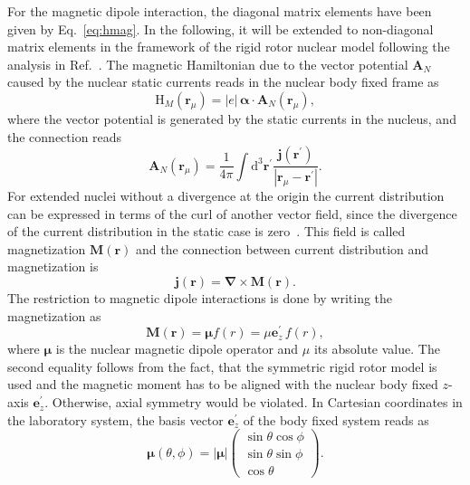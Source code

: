 For the magnetic dipole interaction, the diagonal matrix elements have been given by Eq.~\eqref{eq:hmag}. In the following, it will be extended to non-diagonal matrix elements in the framework of the rigid rotor nuclear model following the analysis in Ref.~\cite{Steffen1985}. The magnetic Hamiltonian due to the vector potential $\mathbf{A}_N$ caused by the nuclear static currents reads in the nuclear body fixed frame as
\begin{equation}
\label{eq:Hmag_rot}
\text{H}_{M}(\mathbf{r}_\mu) = |e|\,\boldsymbol{\alpha}\cdot \mathbf{A}_N(\mathbf{r}_\mu),
\end{equation}
where the vector potential is generated by the static currents in the nucleus, and the connection reads~\cite{jackson1999}
\begin{equation}
\mathbf{A}_N(\mathbf{r}_\mu) = \frac{1}{4\pi}\int\text{d}^3\mathbf{r}^\prime \frac{\mathbf{j}(\mathbf{r}^\prime)}{|\mathbf{r}_\mu-\mathbf{r}^\prime|}.
\end{equation}
For extended nuclei without a divergence at the origin the current distribution can be expressed in terms of the curl of another vector field, since the divergence of the current distribution in the static case is zero~\cite{jackson1999}. This field is called magnetization $\mathbf{M}(\mathbf{r})$ and the connection between current distribution and magnetization is
\begin{equation}
\mathbf{j}(\mathbf{r}) = \boldsymbol{\nabla} \times  \mathbf{M}(\mathbf{r}).
\end{equation}
The restriction to magnetic dipole interactions is done by writing the magnetization as
\begin{equation}
\mathbf{M}(\mathbf{r})=\boldsymbol{\mu}f(r)=\mu\mathbf{e}_z^\prime\,f(r),
\end{equation}
where $\boldsymbol{\mu}$ is the nuclear magnetic dipole operator and $\mu$ its absolute value. The second equality follows from the fact, that the symmetric rigid rotor model is used and the magnetic moment has to be aligned with the nuclear body fixed $z$-axis $\mathbf{e}_z^\prime$. Otherwise, axial symmetry would be violated.
In Cartesian coordinates in the laboratory system, the basis vector $\mathbf{e}_z^\prime$ of the body fixed system reads as
\begin{equation}
\label{eq:magMomOp}
\boldsymbol{\mu}(\theta,\phi)=|\boldsymbol{\mu}|
\begin{pmatrix}
\sin\theta\cos\phi \\ \sin\theta\sin\phi \\ \cos\theta
\end{pmatrix}.
\end{equation}
